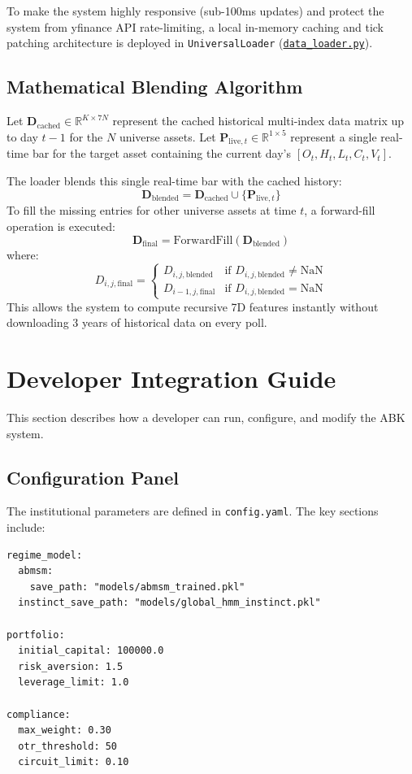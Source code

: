 \documentclass[11pt,a4paper]{article}
\begin{document}
To make the system highly responsive (sub-100ms updates) and protect the system from yfinance API rate-limiting, a local in-memory caching and tick patching architecture is deployed in \texttt{UniversalLoader} (\href{file:///Users/apple/Personal_Files/Codes/QuantSystem/src/engine/data_loader.py}{\texttt{data\_loader.py}}).

\subsection{Mathematical Blending Algorithm}

Let $\mathbf{D}_{\text{cached}} \in \mathbb{R}^{K \times 7N}$ represent the cached historical multi-index data matrix up to day $t-1$ for the $N$ universe assets.
Let $\mathbf{P}_{\text{live}, t} \in \mathbb{R}^{1 \times 5}$ represent a single real-time bar for the target asset containing the current day's $[O_t, H_t, L_t, C_t, V_t]$.

The loader blends this single real-time bar with the cached history:
\begin{equation}
    \mathbf{D}_{\text{blended}} = \mathbf{D}_{\text{cached}} \cup \{ \mathbf{P}_{\text{live}, t} \}
\end{equation}
To fill the missing entries for other universe assets at time $t$, a forward-fill operation is executed:
\begin{equation}
    \mathbf{D}_{\text{final}} = \text{ForwardFill}(\mathbf{D}_{\text{blended}})
\end{equation}
where:
\begin{equation}
    D_{i, j, \text{final}} = 
    \begin{cases}
        D_{i, j, \text{blended}} & \text{if } D_{i, j, \text{blended}} \ne \text{NaN} \\
        D_{i-1, j, \text{final}} & \text{if } D_{i, j, \text{blended}} = \text{NaN}
    \end{cases}
\end{equation}
This allows the system to compute recursive 7D features instantly without downloading 3 years of historical data on every poll.

\newpage
\section{Developer Integration Guide}

This section describes how a developer can run, configure, and modify the ABK system.

\subsection{Configuration Panel}
The institutional parameters are defined in \texttt{config.yaml}. The key sections include:
\begin{verbatim}
regime_model:
  abmsm:
    save_path: "models/abmsm_trained.pkl"
  instinct_save_path: "models/global_hmm_instinct.pkl"

portfolio:
  initial_capital: 100000.0
  risk_aversion: 1.5
  leverage_limit: 1.0

compliance:
  max_weight: 0.30
  otr_threshold: 50
  circuit_limit: 0.10
\end{verbatim}
\end{document}
